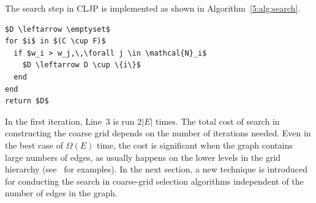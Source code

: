 \documentclass{elsart}
\begin{document}
The search step in CLJP is implemented as shown in
Algorithm~\ref{5:alg:search}.
\begin{lstlisting}[caption={Coarse-Grid Selection Graph Search},label=5:alg:search]
%\textsc{Search-Graph}$(S,\, C,\, F)$%
$D \leftarrow \emptyset$
for $i$ in $(C \cup F)$
  if $w_i > w_j,\,\forall j \in \mathcal{N}_i$
    $D \leftarrow D \cup \{i\}$
  end
end
return $D$
\end{lstlisting}
In the first iteration, Line~3 is run $2|E|$ times. The total cost of
search in constructing the coarse grid depends on the number of
iterations needed. Even in the best case of $\Omega(E)$ time, the cost
is significant when the graph contains large numbers of edges, as
usually happens on the lower levels in the grid hierarchy
(see~\cite{alber-PCGS} for examples). In the next section, a new
technique is introduced for conducting the search in coarse-grid
selection algorithms independent of the number of edges in the graph.
\end{document}
